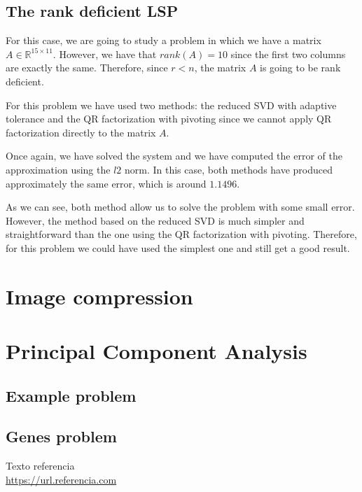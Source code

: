 \documentclass[11pt,a4paper]{article}
\begin{document}
\subsection{The rank deficient LSP}

For this case, we are going to study a problem in which we have a matrix $A \in \mathbb{R}^{15 \times 11}$.
However, we have that $rank(A) = 10$ since the first two columns are exactly the same. Therefore, since
$r < n$, the matrix $A$ is going to be rank deficient.

For this problem we have used two methods: the reduced SVD with adaptive tolerance and the QR
factorization with pivoting since we cannot apply QR factorization directly to the matrix $A$.

Once again, we have solved the system and we have computed the error of the approximation using the $l2$
norm. In this case, both methods have produced approximately the same error, which is around $1.1496$.

As we can see, both method allow us to solve the problem with some small error. However, the method
based on the reduced SVD is much simpler and straightforward than the one using the QR factorization
with pivoting. Therefore, for this problem we could have used the simplest one and still get a good
result.

\section{Image compression}

\section{Principal Component Analysis}

\subsection{Example problem}

\subsection{Genes problem}

\newpage

\begin{thebibliography}{5}

Texto referencia
\\\url{https://url.referencia.com}

\end{thebibliography}
\end{document}
